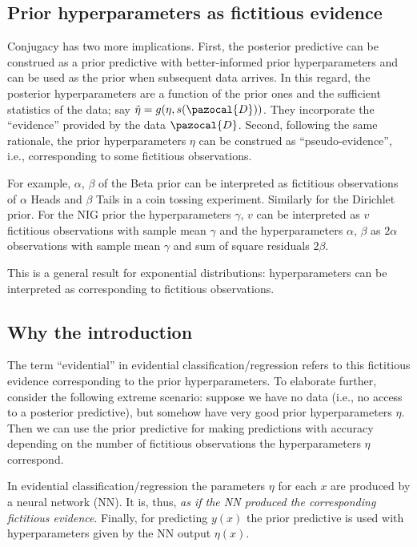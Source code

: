 \subsection{Prior hyperparameters as fictitious evidence}\label{sec:fictitious:evidence}
Conjugacy has two more implications. 
First, the posterior predictive can be construed as a prior predictive with better-informed prior hyperparameters and can be used as the prior when subsequent data arrives.
In this regard, the posterior hyperparameters are a function of the prior ones and the sufficient statistics of the data; say $\tilde{\eta} = g(\eta, s(\pazocal{D}))$.
They incorporate the ``evidence'' provided by the data $\pazocal{D}$.
Second, following the same rationale, the prior hyperparameters $\eta$ can be construed as ``pseudo-evidence'', i.e., corresponding to some fictitious observations.

For example, $\alpha$, $\beta$ of the Beta prior can be interpreted as fictitious observations of $\alpha$ Heads and $\beta$ Tails in a coin tossing experiment.
Similarly for the Dirichlet prior. 
For the NIG prior the hyperparameters $\gamma$, $v$ can be interpreted as $v$ fictitious observations with sample mean $\gamma$ and the hyperparameters $\alpha$, $\beta$ as $2\alpha$ observations with sample mean $\gamma$ and sum of square residuals $2\beta$.

This is a general result for exponential distributions: hyperparameters can be interpreted as corresponding to fictitious observations.

\subsection{Why the introduction}
The term ``evidential'' in evidential classification/regression refers to this fictitious evidence corresponding to the prior hyperparameters. 
To elaborate further, consider the following extreme scenario: suppose we have no data (i.e., no access to a posterior predictive), but somehow have very good prior hyperparameters $\eta$. 
Then we can use the prior predictive for making predictions with accuracy depending on the number of fictitious observations the hyperparameters $\eta$ correspond. 

In evidential classification/regression the parameters $\eta$ for each $x$ are produced by a neural network (NN). 
It is, thus, \textit{as if the NN produced the corresponding fictitious evidence}. 
Finally, for predicting $y(x)$ the prior predictive is used with hyperparameters given by the NN output $\eta(x)$. 

